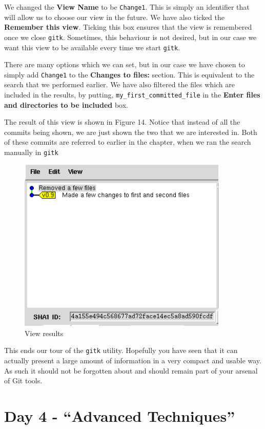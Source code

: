 We changed the \textbf{View Name} to be \texttt{Change1}.  This is simply an identifier that will allow us to choose our view in the future.  We have also ticked the \textbf{Remember this view}.  Ticking this box ensures that the view is remembered once we close \texttt{gitk}.  Sometimes, this behaviour is not desired, but in our case we want this view to be available every time we start \texttt{gitk}.

There are many options which we can set, but in our case we have chosen to simply add \texttt{Change1} to the \textbf{Changes to files:} section.  This is equivalent to the search that we performed earlier.  We have also filtered the files which are included in the results, by putting, \texttt{my\_first\_committed\_file} in the \textbf{Enter files and directories to be included} box.

The result of this view is shown in Figure 14.  Notice that instead of all the commits being shown, we are just shown the two that we are interested in.  Both of these commits are referred to earlier in the chapter, when we ran the search manually in \texttt{gitk}

\begin{figure}[hbt]
\centering
\includegraphics[width=10cm]{images/f-w5-d14.png}
\caption{View results}
\end{figure} 

This ends our tour of the \texttt{gitk} utility.  Hopefully you have seen that it can actually present a large amount of information in a very compact and usable way.  As such it should not be forgotten about and should remain part of your arsenal of Git tools.

\section{Day 4 - ``Advanced Techniques''}
